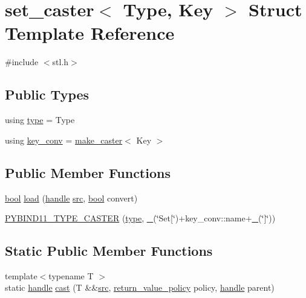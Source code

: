 \hypertarget{structset__caster}{}\section{set\+\_\+caster$<$ Type, Key $>$ Struct Template Reference}
\label{structset__caster}


{\ttfamily \#include $<$stl.\+h$>$}

\subsection*{Public Types}
\begin{DoxyCompactItemize}
\item 
using \mbox{\hyperlink{structset__caster_af955f5e8e104168a805e74992fc5fc63}{type}} = Type
\item 
using \mbox{\hyperlink{structset__caster_a16e9230a0e2ba8cd50428f75dcb9660f}{key\+\_\+conv}} = \mbox{\hyperlink{cast_8h_ab32b52411a6b07420516d79074815713}{make\+\_\+caster}}$<$ Key $>$
\end{DoxyCompactItemize}
\subsection*{Public Member Functions}
\begin{DoxyCompactItemize}
\item 
\mbox{\hyperlink{asdl_8h_af6a258d8f3ee5206d682d799316314b1}{bool}} \mbox{\hyperlink{structset__caster_ae10b8dc5a37d6e209bbcb94ce7b44c22}{load}} (\mbox{\hyperlink{classhandle}{handle}} \mbox{\hyperlink{_s_d_l__opengl__glext_8h_a72e0fdf0f845ded60b1fada9e9195cd7}{src}}, \mbox{\hyperlink{asdl_8h_af6a258d8f3ee5206d682d799316314b1}{bool}} convert)
\item 
\mbox{\hyperlink{structset__caster_ab0f145baeba1be7b712d8a9d4ee70812}{P\+Y\+B\+I\+N\+D11\+\_\+\+T\+Y\+P\+E\+\_\+\+C\+A\+S\+T\+ER}} (\mbox{\hyperlink{structset__caster_af955f5e8e104168a805e74992fc5fc63}{type}}, \mbox{\hyperlink{descr_8h_af114703e20c6527e87163eb2798f74b8}{\+\_\+}}(\char`\"{}Set\mbox{[}\char`\"{})+key\+\_\+conv\+::name+\mbox{\hyperlink{descr_8h_af114703e20c6527e87163eb2798f74b8}{\+\_\+}}(\char`\"{}\mbox{]}\char`\"{}))
\end{DoxyCompactItemize}
\subsection*{Static Public Member Functions}
\begin{DoxyCompactItemize}
\item 
{\footnotesize template$<$typename T $>$ }\\static \mbox{\hyperlink{classhandle}{handle}} \mbox{\hyperlink{structset__caster_a28ff3fb56435999d7019c7f59e43a081}{cast}} (T \&\&\mbox{\hyperlink{_s_d_l__opengl__glext_8h_a72e0fdf0f845ded60b1fada9e9195cd7}{src}}, \mbox{\hyperlink{detail_2common_8h_adde72ab1fb0dd4b48a5232c349a53841}{return\+\_\+value\+\_\+policy}} policy, \mbox{\hyperlink{classhandle}{handle}} parent)
\end{DoxyCompactItemize}


